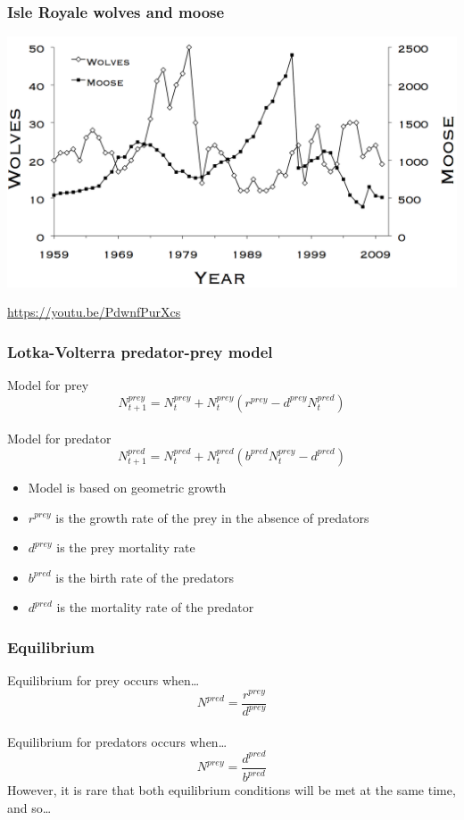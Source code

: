 \documentclass[color=usenames,dvipsnames]{beamer}\usepackage[]{graphicx}\usepackage[]{color}
\begin{document}
\begin{frame}
  \frametitle{Isle Royale wolves and moose}
  \centering
  \includegraphics[width=1\textwidth]{figs/Fig01_wolfmoosechronology} \par
  \url{https://youtu.be/PdwnfPurXcs}
\end{frame}





\begin{frame}
  \frametitle{Lotka-Volterra predator-prey model}
  \Large
  Model for prey
  \[
    N^{prey}_{t+1} = N^{prey}_t + N^{prey}_t (r^{prey} - d^{prey} N^{pred}_t)
  \] \\
  \vspace{1cm}
  \pause
  Model for predator
  \[
    N^{pred}_{t+1} = N^{pred}_t + N^{pred}_t (b^{pred}N^{prey}_t - d^{pred})
  \]
  \pause
  \vfill
  \normalsize
  \begin{itemize}
    \item Model is based on geometric growth
    \item $r^{prey}$ is the growth rate of the prey in the absence of
      predators
    \item $d^{prey}$ is the prey mortality rate
    \item $b^{pred}$ is the birth rate of the predators
    \item $d^{pred}$ is the mortality rate of the predator
  \end{itemize}
\end{frame}



\begin{frame}
  \frametitle{Equilibrium}
  \Large
  Equilibrium for prey occurs when\dots
  \[
    N^{pred} = \frac{r^{prey}}{d^{prey}}
  \] \\
  \vspace{1cm}
  \pause
  Equilibrium for predators occurs when\dots
  \[
    N^{prey} = \frac{d^{pred}}{b^{pred}}
  \]
  \pause
  \vfill
  However, it is rare that both equilibrium conditions will be met at
  the same time, and so\dots
\end{frame}
\end{document}
